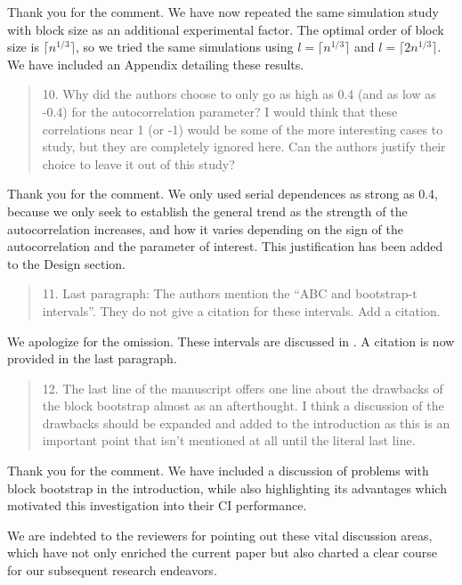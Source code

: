 \documentclass[12pt]{article}
\newenvironment{comment}%
{\begin{quotation}\noindent\small\it\color{darkblue}\ignorespaces%
}{\end{quotation}}
\begin{document}
Thank you for the comment. We have now repeated the same simulation study with 
block size as an 
additional experimental factor. The optimal order of block size is 
$\lceil n^{1/3} \rceil$, so we tried the same simulations using 
$l = \lceil n^{1/3} \rceil$ and $l = \lceil 2n^{1/3} \rceil$. We have included
an Appendix detailing these results. 




\begin{comment}
10.   Why did the authors choose to only go as high as 0.4 (and as low as -0.4) 
for the autocorrelation parameter?  I would think that these correlations near 1 
(or -1) would be some of the more interesting cases to study, but they are 
completely ignored here.  Can the authors justify their choice to leave it out 
of this study?
\end{comment}

Thank you for the comment. We only
used serial dependences as strong as 0.4, because we only seek to 
establish the 
general trend as the strength of the autocorrelation 
increases, and how it varies depending on the sign of the autocorrelation and 
the parameter of interest. This justification has been added to the Design 
section.

\begin{comment}
11.    Last paragraph: The authors mention the “ABC and bootstrap-t intervals”.  
They do not give a citation for these intervals.   Add a citation. 
\end{comment}

We apologize for the omission. These intervals are discussed in 
\citep{efron1993introduction}. A citation is now provided in the last paragraph.

\begin{comment}
12.    The last line of the manuscript offers one line about the drawbacks of 
the block bootstrap almost as an afterthought.  I think a discussion of the 
drawbacks should be expanded and added to the introduction as this is an 
important point that isn’t mentioned at all until the literal last line. 
\end{comment}

Thank you for the comment. We have included a discussion of problems 
with block bootstrap in the introduction, while also highlighting its advantages
which motivated this investigation into their CI performance.


We are indebted to the reviewers for pointing out these vital discussion areas,
which have not only enriched the current paper but also charted a clear course
for our subsequent research endeavors.




\end{document}
